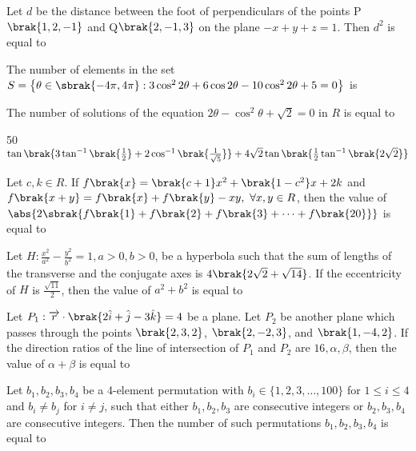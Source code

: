 \item Let $d$ be the distance between the foot of perpendiculars of the points P$\brak{1, 2, -1}$ and Q$\brak{2, -1, 3}$ on the plane $-x+y+z=1.$ Then $d^2$ is equal to \hfill {}


\item The number of elements in the set $S = \left\{\theta \in \sbrak{-4\pi, 4\pi} : 3\cos^2 2\theta + 6\cos 2\theta - 10\cos^2 2\theta + 5 = 0 \right\}$ is 
\hfill {}

\item The number of solutions of the equation $2\theta - \cos^2\theta + \sqrt{2} = 0$ in $R$ is equal to
\hfill {}


\item 50$ \tan\brak{3 \tan^{-1}\brak{\frac{1}{2}} + 2 \cos^{-1}\brak{\frac{1}{\sqrt{5}}}} + 4\sqrt{2} \tan\brak{\frac{1}{2} \tan^{-1}\brak{2\sqrt{2}}}$\hfill {}


\item Let $c, k \in R$. If $f\brak{x} = \brak{c+1}x^2 + \brak{1 - c^2}x + 2k$ and $f\brak{x+y} = f\brak{x} + f\brak{y} - xy, \ \forall x, y \in R$, then the value of $\abs{ 2 \sbrak{ f\brak{1} + f\brak{2} + f\brak{3} + \dots + f\brak{20} } }$ is equal to
\hfill {}

\item Let $H: \frac{x^2}{a^2} - \frac{y^2}{b^2} = 1, a > 0, b > 0$, be a hyperbola such that the sum of lengths of the transverse and the conjugate axes is $4\brak{2\sqrt{2} + \sqrt{14}}$. If the eccentricity of $H$ is $\frac{\sqrt{11}}{2}$, then the value of $a^2 + b^2$ is equal to
\hfill {}

\item Let $P_1: \overrightarrow{r} \cdot \brak{2\hat{i} + \hat{j} - 3\hat{k}} = 4$ be a plane. Let $P_2$ be another plane which passes through the points $\brak{2, 3, 2}$, $\brak{2, -2, 3}$, and $\brak{1, -4, 2}$. If the direction ratios of the line of intersection of $P_1$ and $P_2$ are $16, \alpha, \beta$, then the value of $\alpha + \beta$ is equal to
\hfill {}

\item Let $b_1, b_2, b_3, b_4$ be a 4-element permutation with $b_i \in \{1, 2, 3, \ldots, 100\}$ for $1 \leq i \leq 4$ and $b_i \neq b_j$ for $i \neq j$, such that either $b_1, b_2, b_3$ are consecutive integers or $b_2, b_3, b_4$ are consecutive integers. Then the number of such permutations $b_1, b_2, b_3, b_4$ is equal to
\hfill {}

%
